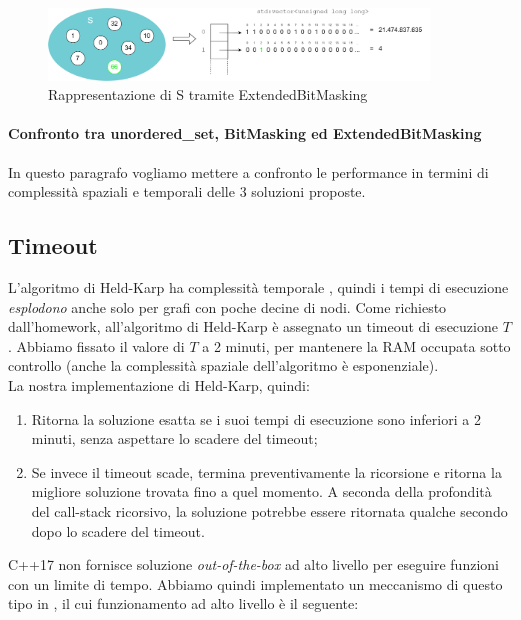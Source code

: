 \begin{figure}[h]
	\centering
	\includegraphics[width=0.9\textwidth]{./images/BitMaskingExtended Example.png}
	\caption{Rappresentazione di S tramite ExtendedBitMasking}
	\label{fig:extendedbitmasking-example}
\end{figure}

\paragraph{Confronto tra unordered\_set, BitMasking ed ExtendedBitMasking}
In questo paragrafo vogliamo mettere a confronto le performance in termini di complessità spaziali e temporali delle 3 soluzioni proposte.

\subsection{Timeout}

\noindent L'algoritmo di Held-Karp ha complessità temporale \complexityHeldKarpTime{}, quindi i tempi di esecuzione \textit{esplodono} anche solo per grafi con poche decine di nodi. Come richiesto dall'homework, all'algoritmo di Held-Karp è assegnato un timeout di esecuzione $T$. Abbiamo fissato il valore di $T$ a 2 minuti, per mantenere la RAM occupata sotto controllo (anche la complessità spaziale dell'algoritmo è esponenziale).\\

\noindent La nostra implementazione di Held-Karp, quindi:

\begin{enumerate}
    \item Ritorna la soluzione esatta se i suoi tempi di esecuzione sono inferiori a 2 minuti, senza aspettare lo scadere del timeout;
    \item Se invece il timeout scade, termina preventivamente la ricorsione e ritorna la migliore soluzione trovata fino a quel momento. A seconda della profondità del call-stack ricorsivo, la soluzione potrebbe essere ritornata qualche secondo dopo lo scadere del timeout.
\end{enumerate}

\noindent C++17 non fornisce soluzione \textit{out-of-the-box} ad alto livello per eseguire funzioni con un limite di tempo. Abbiamo quindi implementato un meccanismo di questo tipo in , il cui funzionamento ad alto livello è il seguente:

